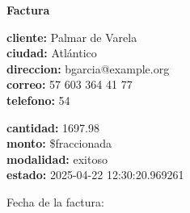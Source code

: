 \documentclass{article}
\begin{document}
\begin{center}
    {\LARGE \textbf{Factura}}\\[1cm]
\end{center}

\textbf{cliente:} Palmar de Varela \\
\textbf{ciudad:} Atlántico \\
\textbf{direccion:} bgarcia@example.org \\
\textbf{correo:} 57 603 364 41 77 \\
\textbf{telefono:} 54 \\

\vspace{0.5cm}

\textbf{cantidad:} 1697.98 \\
\textbf{monto:} \$fraccionada \\
\textbf{modalidad:} exitoso \\
\textbf{estado:} 2025-04-22 12:30:20.969261 \\

\vspace{1cm}

Fecha de la factura: 
\end{document}
